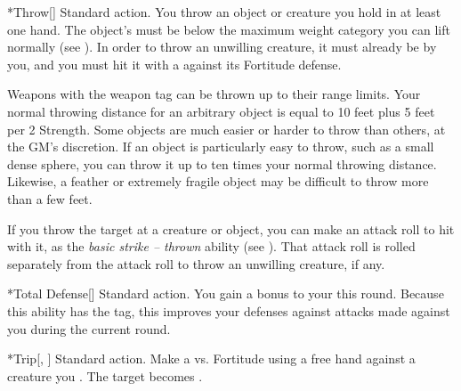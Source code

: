     \begin{activeability}*{Throw}[]
      \abilityusagetime Standard action.
      \rankline
      You throw an object or creature you hold in at least one hand.
      The object's  must be below the maximum weight category you can lift normally (see ).
      In order to throw an unwilling creature, it must already be \grappled by you, and you must hit it with a  against its Fortitude defense.

      Weapons with the  weapon tag can be thrown up to their range limits.
      Your normal throwing distance for an arbitrary object is equal to 10 feet plus 5 feet per 2 Strength.
      Some objects are much easier or harder to throw than others, at the GM's discretion.
      If an object is particularly easy to throw, such as a small dense sphere, you can throw it up to ten times your normal throwing distance.
      Likewise, a feather or extremely fragile object may be difficult to throw more than a few feet.

      If you throw the target at a creature or object, you can make an attack roll to hit with it, as the \textit{basic strike -- thrown} ability (see ).
      That attack roll is rolled separately from the attack roll to throw an unwilling creature, if any.
    \end{activeability}

    \begin{activeability}*{Total Defense}[]
      \abilityusagetime Standard action.
      \rankline
      You gain a  bonus to your  this round.
      Because this ability has the  tag, this improves your defenses against attacks made against you during the current round.
    \end{activeability}

    \begin{activeability}*{Trip}[, ]
      \abilityusagetime Standard action.
      \rankline
      Make a  vs. Fortitude using a free hand against a creature you .
      \hit The target becomes \prone.
    \end{activeability}

